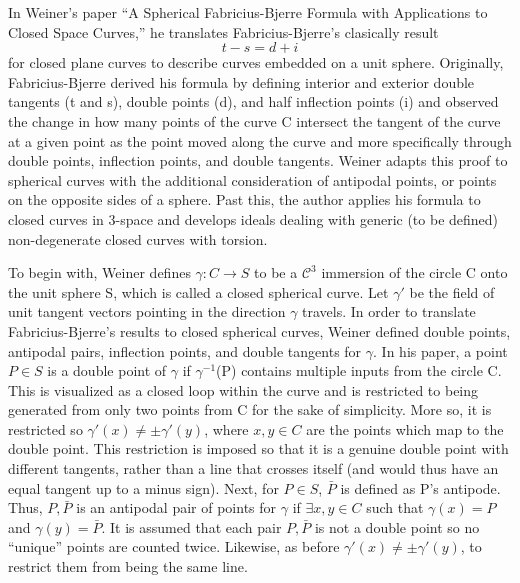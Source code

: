 \documentclass{article}
\begin{document}
In Weiner's paper ``A Spherical Fabricius-Bjerre Formula with Applications to Closed Space Curves,'' he translates Fabricius-Bjerre's clasically result
\begin{equation*}
t - s = d +i
\end{equation*}
for closed plane curves to describe curves embedded on a unit sphere. 
Originally, Fabricius-Bjerre derived his formula by defining interior and exterior double tangents (t and s), double points (d), and half inflection points (i)
and observed the change in how many points of the curve C intersect the tangent of the curve at a given point as the point moved along the curve and more specifically
through double points, inflection points, and double tangents.
Weiner adapts this proof to spherical curves with the additional consideration of antipodal points, or points on the opposite sides of a sphere.
Past this, the author applies his formula to closed curves in 3-space and develops ideals dealing with generic (to be defined) non-degenerate closed curves with torsion.

To begin with, Weiner defines $\gamma: C \to S$ to be a $\mathcal{C}^3$ immersion of the circle C onto the unit sphere S, which is called a closed spherical curve.
Let $\gamma'$ be the field of unit tangent vectors pointing in the direction $\gamma$ travels.
In order to translate Fabricius-Bjerre's results to closed spherical curves, Weiner defined double points, antipodal pairs, inflection points, and double tangents for $\gamma$.
In his paper, a point $P \in S$ is a double point of $\gamma$ if $\gamma^{-1}$(P) contains multiple inputs from the circle C. 
This is visualized as a closed loop within the curve and is restricted to being generated from only two points from C for the sake of simplicity.
More so, it is restricted so $\gamma'(x) \neq \pm \gamma'(y)$, where $x,y \in C$ are the points which map to the double point. 
This restriction is imposed so that it is a genuine double point with different tangents, rather than a line that crosses itself (and would thus have an equal tangent up to a minus sign).
Next, for $P \in S$, $\bar{P}$ is defined as P's antipode.
Thus, ${P,\bar{P}}$ is an antipodal pair of points for $\gamma$ if $\exists x,y \in C$ such that $\gamma(x) = P$ and $\gamma(y) = \bar{P}$.
It is assumed that each pair ${P,\bar{P}}$ is not a double point so no ``unique'' points are counted twice.
Likewise, as before $\gamma'(x) \neq \pm \gamma'(y)$, to restrict them from being the same line. %
\end{document}
